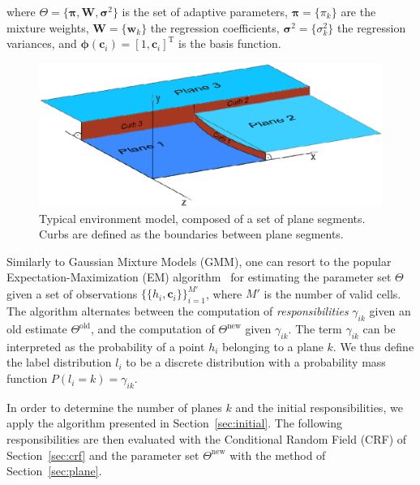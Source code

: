 where $\Theta=\{\boldsymbol{\pi},\mathbf{W},\boldsymbol{\sigma}^2\}$ is the set
of adaptive parameters, $\boldsymbol{\pi}=\{\pi_k\}$ are the mixture weights,
$\mathbf{W}=\{\mathbf{w}_k\}$ the regression coefficients,
$\boldsymbol{\sigma}^2=\{\sigma^2_k\}$ the regression variances, and
$\boldsymbol{\phi}(\mathbf{c}_i)=[1,\mathbf{c}_i]^\text{T}$ is the basis
function.

\begin{figure}[t]
\centering
\includegraphics[width=\columnwidth]{fig/model.eps}
\caption{Typical environment model, composed of a set of plane segments. Curbs
are defined as the boundaries between plane segments.}
\label{fig:model}
\end{figure}

Similarly to Gaussian Mixture Models (GMM), one can resort to the popular
Expectation-Maximization (EM) algorithm~\cite{dempster77maximum} for estimating
the parameter set $\Theta$ given a set of observations
$\{\{h_i,\mathbf{c}_i\}\}_{i=1}^{M'}$, where $M'$ is the number of valid cells.
The algorithm alternates between the computation of \emph{responsibilities}
$\gamma_{ik}$ given an old estimate $\Theta^\text{old}$, and the computation of
$\Theta^\text{new}$ given $\gamma_{ik}$. The term $\gamma_{ik}$ can be
interpreted as the probability of a point $h_i$ belonging to a plane $k$. We
thus define the label distribution $l_i$ to be a discrete distribution with a
probability mass function $P(l_i=k)=\gamma_{ik}$.

In order to determine the number of planes $k$ and the initial responsibilities,
we apply the algorithm presented in Section~\ref{sec:initial}. The following
responsibilities are then evaluated with the Conditional Random Field (CRF) of
Section~\ref{sec:crf} and the parameter set $\Theta^\text{new}$ with the method
of Section~\ref{sec:plane}.
